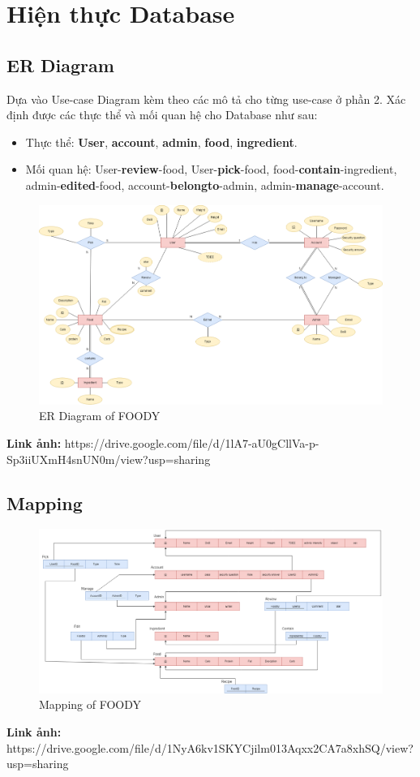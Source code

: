 \section{Hiện thực Database}
    \subsection{ER Diagram}
    Dựa vào Use-case Diagram kèm theo các mô tả cho từng use-case ở phần 2. Xác định được các thực thể và mối quan hệ cho Database như sau:
        \begin{itemize}
            \item Thực thể: \textbf{User}, \textbf{account}, \textbf{admin}, \textbf{food}, \textbf{ingredient}.
            \item Mối quan hệ: User-\textbf{review}-food, User-\textbf{pick}-food, food-\textbf{contain}-ingredient, admin-\textbf{edited}-food, account-\textbf{belongto}-admin, admin-\textbf{manage}-account.
        \end{itemize}
        \begin{figure}[h]
            \centering
            \includegraphics[width=0.99\linewidth]{images/backendDB/Foody_DB-ERD.drawio.png}
            \caption{ER Diagram of FOODY}
        \end{figure}
    \textbf{Link ảnh:} https://drive.google.com/file/d/1lA7-aU0gCllVa-p-Sp3iiUXmH4snUN0m/view?usp=sharing
    \newpage
    \subsection{Mapping}
        \begin{figure}[h]
            \centering
            \includegraphics[width=0.99\linewidth]{images/backendDB/Foody_DB-Mapping.drawio.png}
            \caption{Mapping of FOODY}
        \end{figure}
        \textbf{Link ảnh:} https://drive.google.com/file/d/1NyA6kv1SKYCjilm013Aqxx2CA7a8xhSQ/view?usp=sharing
    \newpage
